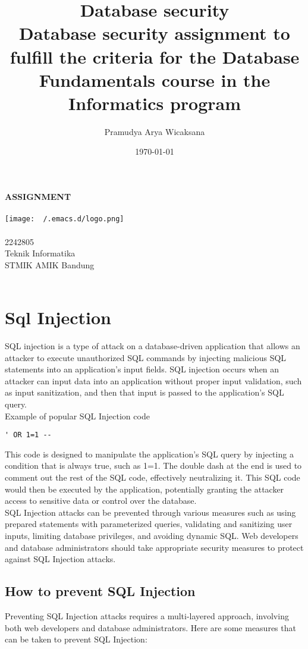 \documentclass[11pt]{article}
\author{Pramudya Arya Wicaksana}
\date{\today}
\title{Database security\\\medskip
\large Database security assignment to fulfill the criteria for the Database Fundamentals course in the Informatics program}
\makeatletter
\renewcommand{\maketitle}{
\begin{titlepage}
\begin{center}
\Huge \textbf{ASSIGNMENT} \\
\vspace{1em}
\Huge \textbf{\@title} \\
\bigbreak
\vspace{2em}
\texttt{[image: ~/.emacs.d/logo.png]} \\
\bigbreak
\vspace{1em}
\Large \textbf{\@author} \\
\large 2242805  \\
\bigbreak
\vspace{4em}
\large Teknik Informatika \\
\large STMIK AMIK Bandung \\
\Large \@date \\
\end{center}
\end{titlepage}
}
\let\oldsection\section
\renewcommand\section{\clearpage\oldsection}
\makeatother
\begin{document}
\maketitle
\tableofcontents

\setlength\parindent{0pt}


\section{Sql Injection}
\label{sec:org04b08ac}

SQL injection is a type of attack on a database-driven application that allows an attacker to execute unauthorized SQL commands by injecting malicious SQL statements into an application's input fields. SQL injection occurs when an attacker can input data into an application without proper input validation, such as input sanitization, and then that input is passed to the application's SQL query.\\

Example of popular SQL Injection code\\

\begin{verbatim}
' OR 1=1 --
\end{verbatim}

This code is designed to manipulate the application's SQL query by injecting a condition that is always true, such as 1=1. The double dash at the end is used to comment out the rest of the SQL code, effectively neutralizing it. This SQL code would then be executed by the application, potentially granting the attacker access to sensitive data or control over the database.\\

SQL Injection attacks can be prevented through various measures such as using prepared statements with parameterized queries, validating and sanitizing user inputs, limiting database privileges, and avoiding dynamic SQL. Web developers and database administrators should take appropriate security measures to protect against SQL Injection attacks.\\

\subsection{How to prevent SQL Injection}
\label{sec:org397d8b3}

Preventing SQL Injection attacks requires a multi-layered approach, involving both web developers and database administrators. Here are some measures that can be taken to prevent SQL Injection:\\
\end{document}
